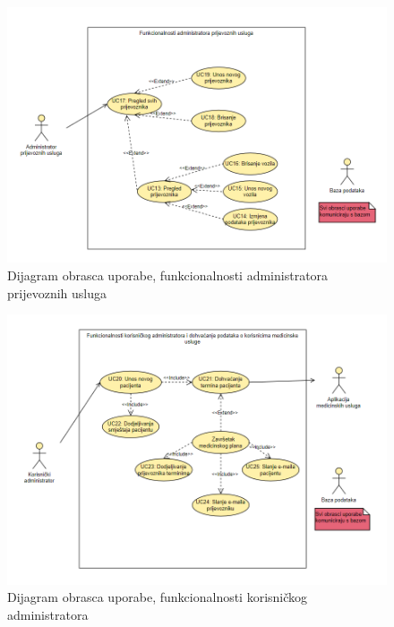 					\begin{figure}[H]
						\includegraphics[width=\textwidth]{slike/uc3.PNG} %
						\caption{Dijagram obrasca uporabe, funkcionalnosti administratora prijevoznih usluga} 
						\label{fig:uc3} %
					\end{figure}
					
					\begin{figure}[H]
						\includegraphics[width=\textwidth]{slike/uc4.PNG} %
						\caption{Dijagram obrasca uporabe, funkcionalnosti korisničkog administratora}
						\label{fig:uc4} %
					\end{figure}
					
				\eject		
				

